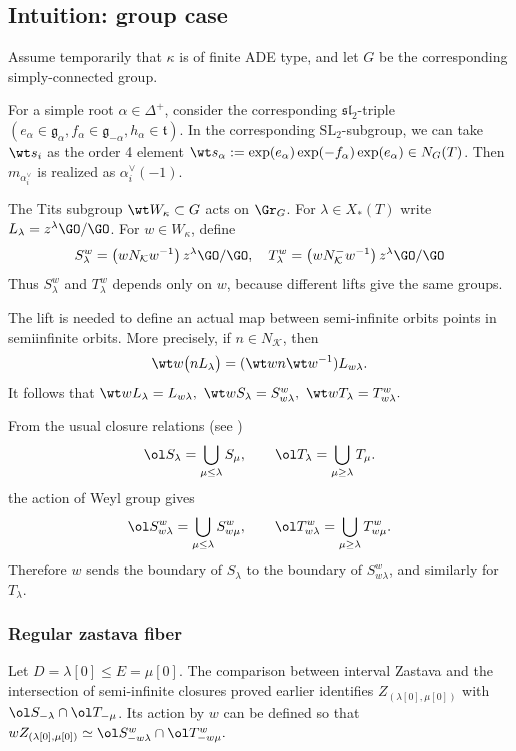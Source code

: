 \documentclass{amsart}
\numberwithin{equation}{section}
\numberwithin{figure}{section}
\theoremstyle{definition}
\theoremstyle{remark}
\renewcommand{\c}[1]{\mathcal{#1}}
\newcommand{\f}[1]{\mathfrak{#1}}
\renewcommand{\r}[1]{\mathrm{#1}}
\renewcommand{\sl}{\mathfrak{sl}}
\newcommand{\SL}{\r{SL}}
\begin{document}
\subsection{Intuition: group case}
\label{subsec:revised-group-case}

Assume temporarily that $\kappa$ is of finite ADE type, and let $G$ be
the corresponding simply-connected group.

For a  simple root $\alpha\in\Delta^+$, consider the corresponding $\sl_2$-triple $(e_\alpha\in \f g_\alpha, f_\alpha\in \f g_{-\alpha},h_\alpha\in \f{t})$. In  the corresponding  $\SL_2$-subgroup, we can take $\wt s_i$ as the order 4 element 
$\wt s_\alpha:=\exp(e_\alpha)\exp(-f_\alpha)\exp(e_\alpha)\in N_G(T)$.
Then $m_{\alpha_i^\vee}$ is realized as $\alpha_i^\vee(-1)$.

The Tits subgroup $\wt W_\kappa\subset G$ acts on $\Gr_G$.  For $\lambda\in X_*(T)$ write
$L_\lambda=z^\lambda\GO/\GO$.
For $w\in W_\kappa$, define
$$S^w_\lambda=
\left({w}N_\c K{w}^{-1}\right) z^\lambda\GO/\GO,\quad T^w_\lambda=
\left({w}N^-_\c K{w}^{-1}\right) z^\lambda\GO/\GO$$
Thus $S_\lambda^w$ and $T_\lambda^w$ depends only on $w$, because different lifts give the same groups. 

The lift is needed to define an actual map between semi-infinite orbits points in semiinfinite orbits. More precisely, if
$n\in N_{\c K}$, then
\[
\wt w\bigl(nL_\lambda\bigr)
=(\wt wn\wt w^{-1})L_{w\lambda}.
\]
It follows that
$	\wt wL_\lambda=L_{w\lambda},\ 
\wt wS_\lambda=S_{w\lambda}^w,\ 
\wt wT_\lambda=T_{w\lambda}^w.$


From the usual closure relations (see \cite[\S3]{mirkovic2007geometric})
\[
\ol S_{\lambda}
=\bigcup_{\mu\leq\lambda}S_{\mu},
\qquad
\ol T_{\lambda}
=\bigcup_{\mu\geq\lambda}T_{\mu}.
\] the action of Weyl group gives
\[
\ol S_{w\lambda}^w
=\bigcup_{\mu\leq\lambda}S_{w\mu}^w,
\qquad
\ol T_{w\lambda}^w
=\bigcup_{\mu\geq\lambda}T_{w\mu}^w.
\]
Therefore $w$ sends the boundary of $S_\lambda$ to the boundary of
$S_{w\lambda}^w$, and similarly for $T_\lambda$.

\subsubsection{Regular zastava fiber}

Let $D=\lambda[0]\leq E=\mu[0]$.  The comparison between interval
Zastava and the intersection of semi-infinite closures proved earlier
identifies $Z_{(\lambda[0],\mu[0])}$
with $\ol S_{-\lambda}\cap\ol T_{-\mu}$. Its action by $w$ can be defined so that $ wZ_{(\lambda[0],\mu[0])}
\simeq
\ol S_{-w\lambda}^w\cap
\ol T_{-w\mu}^w
.$
\end{document}
